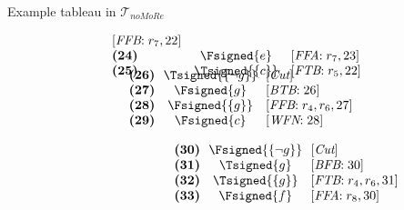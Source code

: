 \begin{frame}{Example tableau in $\mathcal{T}_{\textit{noMoRe}}$}
\begin{center}
\begin{minipage}[t]{16cm}
\begin{minipage}[t]{6cm}
\[\begin{array}{lcl}
  [\textit{FFB}{:}\;r_7, \text{22}]                \\
\textbf{(24)}                                      &
  \Fsigned{e}                                      &
  [\textit{FFA}{:}\;r_7, \text{23}]                \\
\textbf{(25)}                                      &
  \Tsigned{\{c\}}                                  &
  [\textit{FTB}{:}\;r_5, \text{22}]
\vspace{-0.7cm}
\end{array}
\]
\begin{minipage}[t]{1cm}
\[
\hspace{0.25cm}
\begin{array}{l@{~~}c@{~~}l}
\textbf{(26)}                                      &
  \Tsigned{\{\neg g\}}                     &
  [\textit{Cut}]                                   \\
\textbf{(27)}                                      &
  \Fsigned{g}                                      &
  [\textit{BTB}{:}\;\text{26}]                     \\
\textbf{(28)}                                      & \hspace{-0.1cm}
  \Fsigned{\{g\}}                                  \hspace{-0.1cm} &
  [\textit{FFB}{:}\;r_4, r_6, \text{27}]           \\
\textbf{(29)}                                      &
  \Fsigned{c}                                      &
  [\textit{WFN}{:}\;\text{28}]
\end{array}
\]
\end{minipage}
\begin{minipage}[t]{2cm}
\[
\hspace{2.75cm}
\begin{array}{l@{~~}c@{~~}l}
\textbf{(30)}                                      &
  \Fsigned{\{\neg g\}}                     &
  [\textit{Cut}]                                   \\
\textbf{(31)}                                      &
  \Tsigned{g}                                      &
  [\textit{BFB}{:}\;\text{30}]                     \\
\textbf{(32)}                                      &
  \Tsigned{\{g\}}                                  &
  [\textit{FTB}{:}\;r_4, r_6, \text{31}]           \\
\textbf{(33)}                                      &
  \Fsigned{f}                                      &
  [\textit{FFA}{:}\;r_8, \text{30}]                \\

\end{array}\]
\end{minipage}
\end{minipage}
\end{minipage}
\end{center}
\end{frame}
